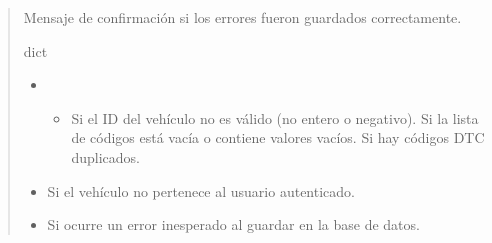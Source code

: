\documentclass[letterpaper,10pt,spanish]{sphinxmanual}
\begin{document}
\begin{fulllineitems}
\begin{quote}
\begin{description}
\sphinxAtStartPar
Mensaje de confirmación si los errores fueron guardados correctamente.

\sphinxAtStartPar
dict

\begin{itemize}
\item {} 
\sphinxAtStartPar
{} \textendash{} \begin{itemize}
\item {} 
\sphinxAtStartPar
Si el ID del vehículo no es válido (no entero o negativo).
    \sphinxhyphen{} Si la lista de códigos está vacía o contiene valores vacíos.
    \sphinxhyphen{} Si hay códigos DTC duplicados.

\end{itemize}


\item {} 
\sphinxAtStartPar
{} \textendash{} Si el vehículo no pertenece al usuario autenticado.

\item {} 
\sphinxAtStartPar
{} \textendash{} Si ocurre un error inesperado al guardar en la base de datos.

\end{itemize}

\end{description}\end{quote}

\end{fulllineitems}

\end{document}
